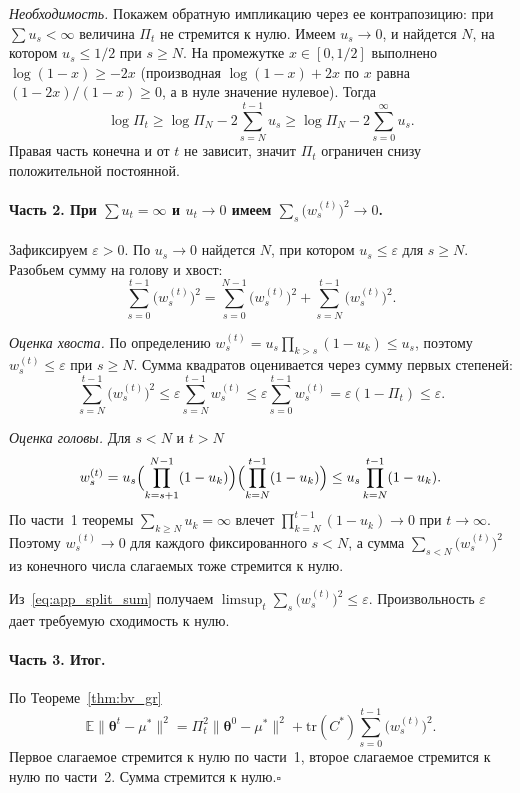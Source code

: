 \documentclass[a4paper,14pt,oneside,openany]{extarticle}
\newcommand{\bbE}{\mathbb{E}}
\newcommand{\btheta}{\boldsymbol{\theta}}
\begin{document}
\emph{Необходимость.} Покажем обратную импликацию через ее контрапозицию: при $\sum u_s < \infty$ величина $\Pi_t$ не стремится к нулю. Имеем $u_s \to 0$, и найдется $N$, на котором $u_s \le 1/2$ при $s \ge N$. На промежутке $x \in [0, 1/2]$ выполнено $\log(1 - x) \ge -2 x$ (производная $\log(1-x) + 2x$ по $x$ равна $(1 - 2x)/(1 - x) \ge 0$, а в нуле значение нулевое). Тогда
\[
    \log \Pi_t \ge \log \Pi_N - 2\sum_{s=N}^{t-1} u_s \ge \log \Pi_N - 2\sum_{s=0}^\infty u_s.
\]
Правая часть конечна и от $t$ не зависит, значит $\Pi_t$ ограничен снизу положительной постоянной.

\paragraph{Часть 2. При $\sum u_t = \infty$ и $u_t \to 0$ имеем $\sum_s \bigl(w_s^{(t)}\bigr)^2 \to 0$.}

Зафиксируем $\varepsilon > 0$. По $u_s \to 0$ найдется $N$, при котором $u_s \le \varepsilon$ для $s \ge N$. Разобьем сумму на голову и хвост:
\begin{equation}
    \sum_{s=0}^{t-1}\bigl(w_s^{(t)}\bigr)^2 = \sum_{s=0}^{N - 1}\bigl(w_s^{(t)}\bigr)^2 + \sum_{s=N}^{t-1}\bigl(w_s^{(t)}\bigr)^2.
    \label{eq:app_split_sum}
\end{equation}

\emph{Оценка хвоста.} По определению $w_s^{(t)} = u_s \prod_{k > s}(1 - u_k) \le u_s$, поэтому $w_s^{(t)} \le \varepsilon$ при $s \ge N$. Сумма квадратов оценивается через сумму первых степеней:
\[
    \sum_{s=N}^{t-1}\bigl(w_s^{(t)}\bigr)^2 \le \varepsilon \sum_{s=N}^{t-1} w_s^{(t)} \le \varepsilon \sum_{s=0}^{t-1} w_s^{(t)} = \varepsilon(1 - \Pi_t) \le \varepsilon.
\]

\emph{Оценка головы.} Для $s < N$ и $t > N$
\[
    w_s^{(t)} = u_s \Bigl(\prod_{k=s+1}^{N-1}(1 - u_k)\Bigr) \Bigl(\prod_{k=N}^{t-1}(1 - u_k)\Bigr) \le u_s \prod_{k=N}^{t-1}(1 - u_k).
\]
По части~1 теоремы $\sum_{k \ge N} u_k = \infty$ влечет $\prod_{k=N}^{t-1}(1 - u_k) \to 0$ при $t \to \infty$. Поэтому $w_s^{(t)} \to 0$ для каждого фиксированного $s < N$, а сумма $\sum_{s < N}\bigl(w_s^{(t)}\bigr)^2$ из конечного числа слагаемых тоже стремится к нулю.

Из~\eqref{eq:app_split_sum} получаем $\limsup_{t} \sum_s \bigl(w_s^{(t)}\bigr)^2 \le \varepsilon$. Произвольность $\varepsilon$ дает требуемую сходимость к нулю.

\paragraph{Часть 3. Итог.} По Теореме~\ref{thm:bv_gr}
\[
    \bbE\|\btheta^t - \mu^*\|^2 = \Pi_t^2 \|\btheta^0 - \mu^*\|^2 + \mathrm{tr}(C^*) \sum_{s=0}^{t-1}\bigl(w_s^{(t)}\bigr)^2.
\]
Первое слагаемое стремится к нулю по части~1, второе слагаемое стремится к нулю по части~2. Сумма стремится к нулю.\hfill$\square$
\end{document}
